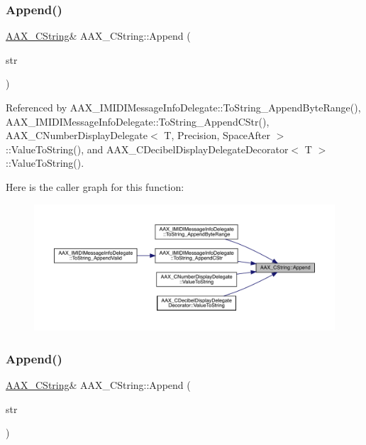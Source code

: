 \subsubsection{\texorpdfstring{Append()}{Append()}\hspace{0.1cm}{\footnotesize\ttfamily [1/2]}}
{\footnotesize\ttfamily \mbox{\hyperlink{a01573}{A\+A\+X\+\_\+\+C\+String}}\& A\+A\+X\+\_\+\+C\+String\+::\+Append (\begin{DoxyParamCaption}\item[{const \mbox{\hyperlink{a01573}{A\+A\+X\+\_\+\+C\+String}} \&}]{str }\end{DoxyParamCaption})}



Referenced by A\+A\+X\+\_\+\+I\+M\+I\+D\+I\+Message\+Info\+Delegate\+::\+To\+String\+\_\+\+Append\+Byte\+Range(), A\+A\+X\+\_\+\+I\+M\+I\+D\+I\+Message\+Info\+Delegate\+::\+To\+String\+\_\+\+Append\+C\+Str(), A\+A\+X\+\_\+\+C\+Number\+Display\+Delegate$<$ T, Precision, Space\+After $>$\+::\+Value\+To\+String(), and A\+A\+X\+\_\+\+C\+Decibel\+Display\+Delegate\+Decorator$<$ T $>$\+::\+Value\+To\+String().

Here is the caller graph for this function\+:
\nopagebreak
\begin{figure}[H]
\begin{center}
\leavevmode
\includegraphics[width=350pt]{a01573_a53b726507fec5a24ffb46e9af194a958_icgraph}
\end{center}
\end{figure}
\mbox{\label{a01573_a6ed6be18fcfa25acfeb7967e282d9fa8}} 
\subsubsection{\texorpdfstring{Append()}{Append()}\hspace{0.1cm}{\footnotesize\ttfamily [2/2]}}
{\footnotesize\ttfamily \mbox{\hyperlink{a01573}{A\+A\+X\+\_\+\+C\+String}}\& A\+A\+X\+\_\+\+C\+String\+::\+Append (\begin{DoxyParamCaption}\item[{const char $\ast$}]{str }\end{DoxyParamCaption})}

